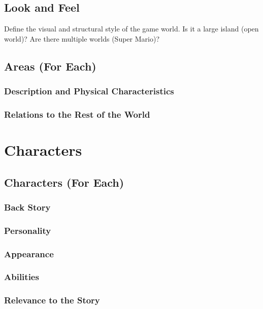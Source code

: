 \documentclass[12pt]{article}
\begin{document}
\subsection{Look and Feel}

Define the visual and structural style of the game world. Is it a large island (open world)? Are there multiple worlds (Super Mario)?

\subsection{Areas (For Each)}

\subsubsection{Description and Physical Characteristics}

\subsubsection{Relations to the Rest of the World}

\section{Characters}

\subsection{Characters (For Each)}

\subsubsection{Back Story}

\subsubsection{Personality}

\subsubsection{Appearance}

\subsubsection{Abilities}

\subsubsection{Relevance to the Story}
\end{document}
